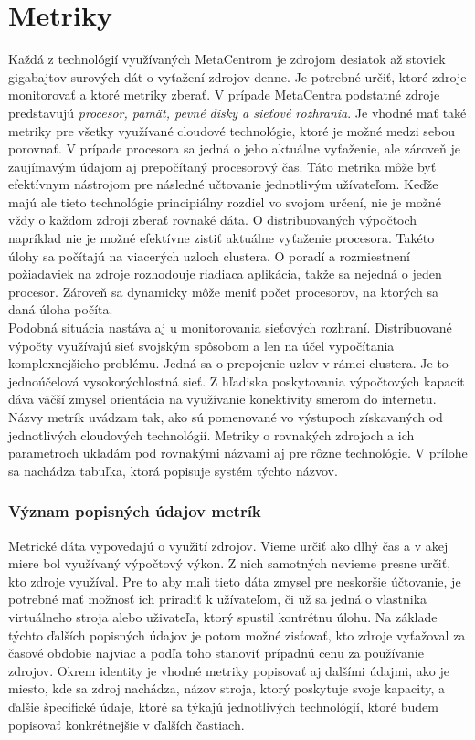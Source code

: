 \documentclass[12pt,twoside,color,cover,table]{fithesis3}
\begin{document}
\chapter{Metriky}
Každá z technológií využívaných MetaCentrom je zdrojom desiatok až stoviek gigabajtov surových dát o vyťažení zdrojov denne. Je potrebné určiť, ktoré zdroje monitorovať a ktoré metriky zberať. V prípade MetaCentra podstatné
zdroje predstavujú \emph{procesor, pamät, pevné disky a sieťové rozhrania}. Je vhodné mať také metriky pre všetky využívané cloudové technológie,
ktoré je možné medzi sebou porovnať. V prípade procesora sa jedná o jeho aktuálne vyťaženie, ale zároveň je zaujímavým údajom aj prepočítaný procesorový čas. Táto metrika môže byť efektívnym
nástrojom pre následné učtovanie jednotlivým užívateľom. Keďže majú ale tieto technológie principiálny rozdiel vo svojom určení, nie je možné vždy o každom zdroji zberať rovnaké dáta. 
O distribuovaných výpočtoch napríklad nie je možné efektívne zistiť aktuálne vyťaženie procesora. Takéto úlohy sa počítajú na viacerých uzloch clustera. O poradí a rozmiestnení požiadaviek na zdroje
rozhodouje riadiaca aplikácia, takže sa nejedná o jeden procesor. Zároveň sa dynamicky môže meniť počet procesorov, na ktorých sa daná úloha počíta.
\\Podobná situácia nastáva aj u monitorovania sieťových rozhraní. Distribuované výpočty využívajú sieť svojským spôsobom a len na účel vypočítania komplexnejšieho problému. Jedná sa o prepojenie
uzlov v rámci clustera. Je to jednoúčelová vysokorýchlostná sieť. Z hľadiska poskytovania výpočtových kapacít dáva väčší zmysel orientácia na využívanie konektivity smerom do internetu. 
\\Názvy metrík uvádzam tak, ako sú pomenované vo výstupoch získavaných od jednotlivých cloudových technológií. Metriky o rovnakých zdrojoch a ich parametroch ukladám pod rovnakými názvami aj pre
rôzne technológie. V prílohe sa nachádza tabuľka, ktorá popisuje systém týchto názvov.

\subsection{Význam popisných údajov metrík}
Metrické dáta vypovedajú o využití zdrojov. Vieme určiť ako dlhý čas a v akej miere bol využívaný výpočtový výkon. Z nich samotných nevieme presne určiť, kto zdroje využíval. Pre to aby mali tieto dáta zmysel 
pre neskoršie účtovanie, je potrebné mať možnosť ich priradiť k užívateľom, či už sa jedná o vlastnika virtuálneho stroja alebo uživateľa, ktorý spustil kontrétnu úlohu. Na základe týchto ďalších popisných  údajov je potom 
možné zisťovať, kto zdroje vyťažoval za časové obdobie najviac a podľa toho stanoviť prípadnú cenu za používanie zdrojov. Okrem identity je vhodné metriky popisovať aj ďalšími údajmi, ako je miesto, kde
sa zdroj nachádza, názov stroja, ktorý poskytuje svoje kapacity, a ďalšie špecifické údaje, ktoré sa týkajú jednotlivých technológií, ktoré budem popisovať konkrétnejšie v ďalších častiach.
\end{document}

